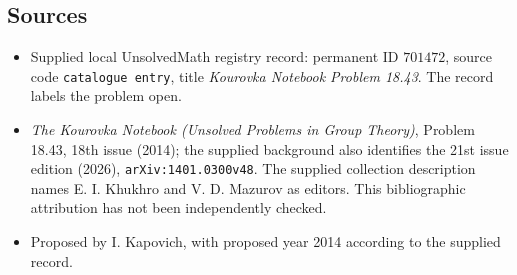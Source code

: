 \documentclass[11pt]{article}
\begin{document}
\subsection{Sources}
\begin{itemize}
\item Supplied local UnsolvedMath registry record: permanent ID \(701472\), source code \texttt{catalogue entry}, title \emph{Kourovka Notebook Problem 18.43}. The record labels the problem open.
\item \emph{The Kourovka Notebook (Unsolved Problems in Group Theory)}, Problem 18.43, 18th issue (2014); the supplied background also identifies the 21st issue edition (2026), \texttt{arXiv:1401.0300v48}. The supplied collection description names E. I. Khukhro and V. D. Mazurov as editors. This bibliographic attribution has not been independently checked.
\item Proposed by I. Kapovich, with proposed year 2014 according to the supplied record.
\end{itemize}
\end{document}
